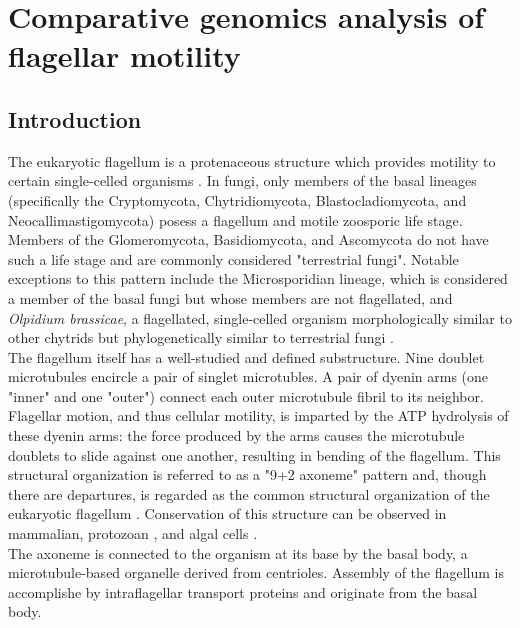 \chapter{Comparative genomics analysis of flagellar motility}
\label{app:Flagella}
\section{Introduction}
The eukaryotic flagellum is a protenaceous structure which provides motility to certain single-celled organisms \cite{Haimo1981}. In fungi, only members of the basal lineages (specifically the Cryptomycota, Chytridiomycota, Blastocladiomycota, and Neocallimastigomycota) posess a flagellum and motile zoosporic life stage. Members of the Glomeromycota, Basidiomycota, and Ascomycota do not have such a life stage \cite{Stajich2009} and are commonly considered "terrestrial fungi". Notable exceptions to this pattern include the Microsporidian lineage, which is considered a member of the basal fungi but whose members are not flagellated, and \textit{Olpidium brassicae}, a flagellated, single-celled organism morphologically similar to other chytrids but phylogenetically similar to terrestrial fungi \cite{Sekimoto2011}. \\
\indent The flagellum itself has a well-studied and defined substructure. Nine doublet microtubules encircle a pair of singlet microtubles. A pair of dyenin arms (one "inner" and one "outer") connect each outer microtubule fibril to its neighbor. Flagellar motion, and thus cellular motility, is imparted by the ATP hydrolysis of these dyenin arms: the force produced by the arms causes the microtubule doublets to slide against one another, resulting in bending of the flagellum. This structural organization is referred to as a "9+2 axoneme" pattern and, though there are departures, is regarded as the common structural organization of the eukaryotic flagellum \cite{Haimo1981}. Conservation of this structure can be observed in mammalian, protozoan \cite{Inaba2003}, and algal cells \cite{Silflow2001}.\\
\indent The axoneme is connected to the organism at its base by the basal body, a microtubule-based organelle derived from centrioles. Assembly of the flagellum is accomplishe by intraflagellar transport proteins and originate from the basal body.\\
